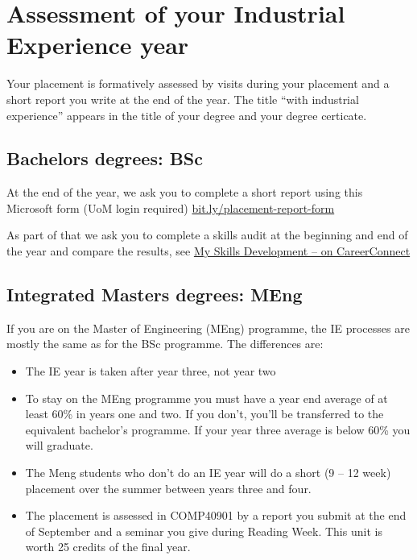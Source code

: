 \documentclass[
]{book}
\providecommand{\tightlist}{%
  \setlength{\itemsep}{0pt}\setlength{\parskip}{0pt}}
\begin{document}
\chapter{Assessment of your Industrial Experience year}\label{assessment}

Your placement is formatively assessed by visits during your placement and a short report you write at the end of the year. The title ``with industrial experience'' appears in the title of your degree and your degree certicate.

\section{Bachelors degrees: BSc}\label{bsc}

At the end of the year, we ask you to complete a short report using this Microsoft form (UoM login required) \href{https://bit.ly/placement-report-form}{bit.ly/placement-report-form}

As part of that we ask you to complete a skills audit at the beginning and end of the year and compare the results, see \href{https://www.careers.manchester.ac.uk/options/skills/myskills}{My Skills Development -- on CareerConnect} \citep{audit}

\section{Integrated Masters degrees: MEng}\label{meng}

If you are on the Master of Engineering (MEng) programme, the IE processes are mostly the same as for the BSc programme. The differences are:

\begin{itemize}
\tightlist
\item
  The IE year is taken after year three, not year two
\item
  To stay on the MEng programme you must have a year end average of at least 60\% in years one and two. If you don't, you'll be transferred to the equivalent bachelor's programme. If your year three average is below 60\% you will graduate.
\item
  The Meng students who don't do an IE year will do a short (9 -- 12 week) placement over the summer between years three and four.
\item
  The placement is assessed in COMP40901 by a report you submit at the end of September and a seminar you give during Reading Week. This unit is worth 25 credits of the final year.
\end{itemize}
\end{document}
